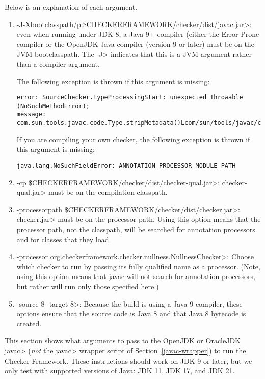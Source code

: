 Below is an explanation of each argument.
\begin{enumerate}
\item \<-J-Xbootclasspath/p:\$CHECKERFRAMEWORK/checker/dist/javac.jar>:
even when running under JDK 8, a Java 9+ compiler (either the Error Prone
compiler or the OpenJDK Java compiler (version 9 or later) must be on the JVM bootclasspath.
The \<-J> indicates that this is a JVM argument rather than a compiler
argument.

The following exception is thrown if this argument is missing:
\begin{Verbatim}
error: SourceChecker.typeProcessingStart: unexpected Throwable (NoSuchMethodError);
message: com.sun.tools.javac.code.Type.stripMetadata()Lcom/sun/tools/javac/code/Type;
\end{Verbatim}

If you are compiling your own checker, the following exception is thrown if this argument is missing:
\begin{Verbatim}
java.lang.NoSuchFieldError: ANNOTATION_PROCESSOR_MODULE_PATH
\end{Verbatim}

\item \<-cp \$CHECKERFRAMEWORK/checker/dist/checker-qual.jar>: \<checker-qual.jar>
must be on the compilation classpath.

\item \<-processorpath \$CHECKERFRAMEWORK/checker/dist/checker.jar>:
\<checker.jar> must be on the processor path. Using this option means that the processor path, not
the classpath, will be searched for annotation processors
and for classes that they load.

\item \<-processor org.checkerframework.checker.nullness.NullnessChecker>:
Choose which checker to run by passing its fully qualified name as a processor.
(Note, using this option means that javac will not search for annotation
processors, but rather will run only those specified here.)

\item \<-source 8 -target 8>: Because the build is using
a Java 9 compiler, these options ensure that the
source code is Java 8 and that Java 8 bytecode is created.

\end{enumerate}



This section shows what arguments to pass to the OpenJDK or OracleJDK
\<javac> (\emph{not} the \<javac> wrapper script of
Section~\ref{javac-wrapper}) to run the Checker
Framework.  These
instructions should work on JDK 9 or later, but we only test with supported
versions of Java: JDK 11, JDK 17, and JDK 21.


